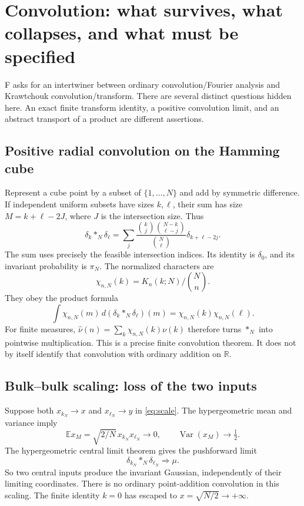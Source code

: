 \documentclass[11pt,reqno]{amsart}
\theoremstyle{remark}\newtheorem{remark}[proposition]{Remark}
\newcommand{\R}{\mathbb R}\newcommand{\F}{\mathcal F}
\begin{document}
\section{Convolution: what survives, what collapses, and what must be specified}\label{sec:convolution}
F asks for an intertwiner between ordinary convolution/Fourier analysis
and Krawtchouk convolution/transform. There are several distinct questions
hidden here. An exact finite transform identity, a positive convolution
limit, and an abstract transport of a product are different assertions.

\subsection{Positive radial convolution on the Hamming cube}
Represent a cube point by a subset of $\{1,\ldots,N\}$ and add by symmetric
difference. If independent uniform subsets have sizes $k,\ell$, their
sum has size $M=k+\ell-2J$, where $J$ is the intersection size. Thus
\begin{equation}\label{eq:hypergroup}
 \delta_k*_N\delta_\ell
 =\sum_j\frac{\binom kj\binom{N-k}{\ell-j}}{\binom N\ell}
 \delta_{k+\ell-2j}.
\end{equation}
The sum uses precisely the feasible intersection indices. Its identity
is $\delta_0$, and its invariant probability is $\pi_N$.
The normalized characters are
\[
 \chi_{n,N}(k)=K_n(k;N)/\binom Nn.
\]
They obey the product formula
\begin{equation}\label{eq:character}
 \int\chi_{n,N}(m)\,d(\delta_k*_N\delta_\ell)(m)
 =\chi_{n,N}(k)\chi_{n,N}(\ell).
\end{equation}
For finite measures, $\widehat\nu(n)=\sum_k\chi_{n,N}(k)\nu(k)$ therefore
turns $*_N$ into pointwise multiplication. This is a precise finite
convolution theorem. It does not by itself identify that convolution
with ordinary addition on $\R$.

\subsection{Bulk--bulk scaling: loss of the two inputs}
Suppose both $x_{k_N}\to x$ and $x_{\ell_N}\to y$ in \eqref{eq:scale}.
The hypergeometric mean and variance imply
\[
 \mathbb E x_M=\sqrt{2/N}\,x_{k_N}x_{\ell_N}\longrightarrow0,
 \qquad \operatorname{Var}(x_M)\longrightarrow\tfrac12.
\]
The hypergeometric central limit theorem gives the pushforward limit
\begin{equation}\label{eq:collapse}
 \delta_{k_N}*_N\delta_{\ell_N}\Longrightarrow\mu.
\end{equation}
So two central inputs produce the invariant Gaussian, independently
of their limiting coordinates. There is no ordinary point-addition
convolution in this scaling. The finite identity $k=0$ has escaped to
$x=\sqrt{N/2}\to+\infty$.
\end{document}
